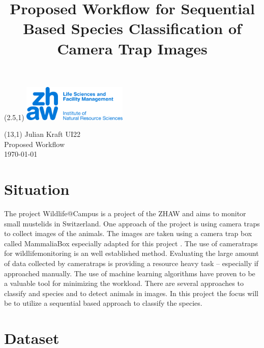 \documentclass{article}
\title{Proposed Workflow for Sequential Based Species Classification of Camera Trap Images}
\makeatletter
\renewcommand{\maketitle}{
  \begin{flushleft} 
    \Large\textmd{\@title} 
    \par
  \end{flushleft}
}
\makeatother
\begin{document}
\begin{textblock}{5}(2.5,1) %
  \includegraphics[width=5cm]{logo.jpg} %
\end{textblock}

\begin{textblock}{6}(13,1) %
        \raggedleft
        Julian Kraft UI22\\
        Proposed Workflow\\
        \today
\end{textblock}

\vspace*{1.5cm}


\maketitle


\section*{Situation}

The project Wildlife@Campus is a project of the ZHAW and aims to monitor small mustelids in Switzerland.
One approach of the project is using camera traps to collect images of the animals. 
The images are taken using a camera trap box called MammaliaBox especially adapted for this
project \autocite{grafWildlifeCampusKleineSaeugetiere2022}.
The use of cameratraps for wildlifemonitoring is an well established method. Evaluating the large amount of data collected by cameratraps
is providing a resource heavy task -- especially if approached manually. The use of machine learning algorithms 
have proven to be a valuable tool for minimizing the workload. There are several approaches to classify and species and
to detect animals in images. In this project the focus will be to utilize a sequential based approach to classify the species.

\section*{Dataset}
\end{document}
